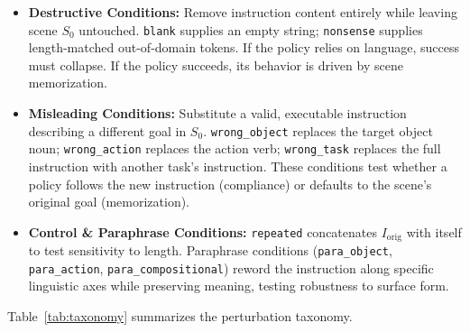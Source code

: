 \documentclass[11pt]{article}
\begin{document}
\begin{itemize}
    \item \textbf{Destructive Conditions:} Remove instruction content entirely while leaving scene $S_0$ untouched. \texttt{blank} supplies an empty string; \texttt{nonsense} supplies length-matched out-of-domain tokens. If the policy relies on language, success must collapse. If the policy succeeds, its behavior is driven by scene memorization.
    \item \textbf{Misleading Conditions:} Substitute a valid, executable instruction describing a different goal in $S_0$. \texttt{wrong\_object} replaces the target object noun; \texttt{wrong\_action} replaces the action verb; \texttt{wrong\_task} replaces the full instruction with another task's instruction. These conditions test whether a policy follows the new instruction (compliance) or defaults to the scene's original goal (memorization).
    \item \textbf{Control \& Paraphrase Conditions:} \texttt{repeated} concatenates $I_{\text{orig}}$ with itself to test sensitivity to length. Paraphrase conditions (\texttt{para\_object}, \texttt{para\_action}, \texttt{para\_compositional}) reword the instruction along specific linguistic axes while preserving meaning, testing robustness to surface form.
\end{itemize}

Table~\ref{tab:taxonomy} summarizes the perturbation taxonomy.
\end{document}
